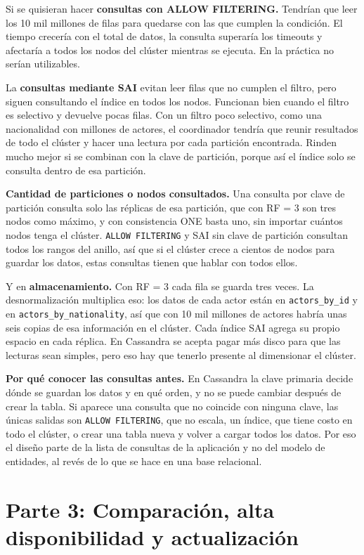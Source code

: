 \documentclass[11pt,a4paper]{article}
\begin{document}
Si se quisieran hacer \textbf{consultas con ALLOW FILTERING.} Tendrían que leer los 10 mil millones de filas para
quedarse con las que cumplen la condición. El tiempo crecería con el total de datos, la
consulta superaría los timeouts y afectaría a todos los nodos del clúster mientras se ejecuta.
En la práctica no serían utilizables.

La \textbf{consultas mediante SAI} evitan leer filas que no cumplen el filtro, pero siguen
consultando el índice en todos los nodos. Funcionan bien cuando el filtro es selectivo y
devuelve pocas filas. Con un filtro poco selectivo, como una nacionalidad con millones de
actores, el coordinador tendría que reunir resultados de todo el clúster y hacer una lectura
por cada partición encontrada. Rinden mucho mejor si se combinan con la clave de partición,
porque así el índice solo se consulta dentro de esa partición.

\textbf{Cantidad de particiones o nodos consultados.} Una consulta por clave de partición
consulta solo las réplicas de esa partición, que con RF = 3 son tres nodos como máximo, y con
consistencia ONE basta uno, sin importar cuántos nodos tenga el clúster. \texttt{ALLOW
FILTERING} y SAI sin clave de partición consultan todos los rangos del anillo, así que si el
clúster crece a cientos de nodos para guardar los datos, estas consultas tienen que hablar con
todos ellos.

Y en \textbf{almacenamiento.} Con RF = 3 cada fila se guarda tres veces. La desnormalización
multiplica eso: los datos de cada actor están en \texttt{actors\_by\_id} y en
\texttt{actors\_by\_nationality}, así que con 10 mil millones de actores habría unas seis
copias de esa información en el clúster. Cada índice SAI agrega su propio espacio en cada
réplica. En Cassandra se acepta pagar más disco para que las lecturas sean simples, pero eso
hay que tenerlo presente al dimensionar el clúster.

\textbf{Por qué conocer las consultas antes.} En Cassandra la clave primaria decide dónde se
guardan los datos y en qué orden, y no se puede cambiar después de crear la tabla. Si aparece
una consulta que no coincide con ninguna clave, las únicas salidas son \texttt{ALLOW
FILTERING}, que no escala, un índice, que tiene costo en todo el clúster, o crear una tabla
nueva y volver a cargar todos los datos. Por eso el diseño parte de la lista de consultas de
la aplicación y no del modelo de entidades, al revés de lo que se hace en una base relacional.

\section{Parte 3: Comparación, alta disponibilidad y actualización}
\end{document}
